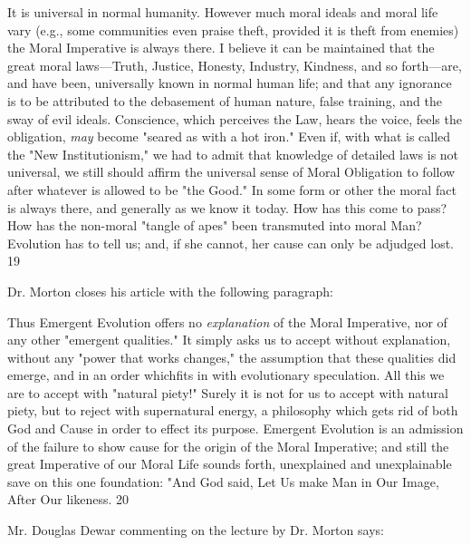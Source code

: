 It is universal in normal humanity. However much moral ideals and moral life vary (e.g.,
some communities even praise theft, provided it is theft from enemies) the Moral Imperative
is always there. I believe it can be maintained that the great moral laws—Truth, Justice,
Honesty, Industry, Kindness, and so forth—are, and have been, universally known in normal
human life; and that any ignorance is to be attributed to the debasement of human nature,
false training, and the sway of evil ideals. Conscience, which perceives the Law, hears the
voice, feels the obligation, \textit{may} become "seared as with a hot iron." Even if, with what is
called the "New Institutionism," we had to admit that knowledge of detailed laws is not
universal, we still should affirm the universal sense of Moral Obligation to follow after
whatever is allowed to be "the Good." In some form or other the moral fact is always there,
and generally as we know it today. How has this come to pass? How has the non-moral
"tangle of apes" been transmuted into moral Man? Evolution has to tell us; and, if she cannot,
her cause can only be adjudged lost. 19

Dr. Morton closes his article with the following paragraph:

Thus Emergent Evolution offers no \textit{explanation} of the Moral Imperative, nor of any other
"emergent qualities." It simply asks us to accept without explanation, without any "power
that works changes," the assumption that these qualities did emerge, and in an order whichfits in with evolutionary speculation. All this we are to accept with "natural piety!" Surely it
is not for us to accept with natural piety, but to reject with supernatural energy, a philosophy
which gets rid of both God and Cause in order to effect its purpose. Emergent Evolution is an
admission of the failure to show cause for the origin of the Moral Imperative; and still the
great Imperative of our Moral Life sounds forth, unexplained and unexplainable save on this
one foundation: "And God said, Let Us make Man in Our Image, After Our likeness. 20

Mr. Douglas Dewar commenting on the lecture by Dr. Morton says:

